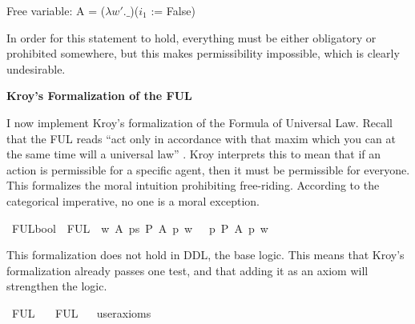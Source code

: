 \begin{isabellebody}
{  Free variable:
    A = ($\lambda w'. \_$)($i_1$ := False) \color{black}%
}%
\endisatagproof
{\isafoldproof}%
%
\isadelimproof
%
\endisadelimproof
%
\begin{isamarkuptext}%
In order for this statement to hold, everything must be either obligatory or
prohibited somewhere, but this makes permissibility impossible, which is clearly undesirable.%
\end{isamarkuptext}\isamarkuptrue%
%
\isadelimproof
%
\endisadelimproof
%
\isatagproof
%
\endisatagproof
{\isafoldproof}%
%
\isadelimproof
%
\endisadelimproof
%
\begin{isamarkuptext}%
\noindent \textbf{Kroy's Formalization of the FUL \label{sec: kroy_ful}}%
\end{isamarkuptext}\isamarkuptrue%
%
\begin{isamarkuptext}%
I now implement Kroy's formalization of the Formula of Universal Law. Recall that the FUL reads
``act only in accordance with that maxim which you can at the same time will a universal law'' \citep[34]{groundwork}.
Kroy interprets this to mean that if an action is permissible for a specific agent, then it must be permissible for everyone.
This formalizes the moral intuition prohibiting free-riding. According to the categorical imperative, 
no one is a moral exception.%
\end{isamarkuptext}\isamarkuptrue%
\isamarkupfalse%
\ FUL{\isacharcolon}{\isacharcolon}{\isachardoublequoteopen}bool{\isachardoublequoteclose}\ \ {\isachardoublequoteopen}FUL\ {\isasymequiv}\ {\isasymforall}w\ A{\isachardot}\ {\isacharparenleft}{\isacharparenleft}{\isasymexists}p{\isacharcolon}{\isacharcolon}s{\isachardot}\ {\isacharparenleft}{\isacharparenleft}P\ {\isacharbraceleft}A\ p{\isacharbraceright}{\isacharparenright}\ w{\isacharparenright}{\isacharparenright}\ \ {\isasymlongrightarrow}{\isacharparenleft}\ {\isacharparenleft}{\isasymforall}p{\isachardot}{\isacharparenleft}\ P\ {\isacharbraceleft}A\ p{\isacharbraceright}{\isacharparenright}\ w{\isacharparenright}{\isacharparenright}{\isacharparenright}\ {\isachardoublequoteclose}\isanewline
%
%
\begin{isamarkuptext}%
This formalization does not hold in DDL, the base logic. This means that Kroy's formalization
already passes one test, and that adding it as an axiom will strengthen the logic.%
\end{isamarkuptext}\isamarkuptrue%
\isamarkupfalse%
\ FUL{\isacharcolon}\isanewline
\ \ \ FUL\isanewline
\ \ \isamarkupfalse%
{\isacharbrackleft}user{\isacharunderscore}axioms{\isacharbrackright}%
\isadelimproof
\ %
\endisadelimproof
%
\isatagproof
{}\isamarkupfalse%
\isanewline
%
\end{isabellebody}

